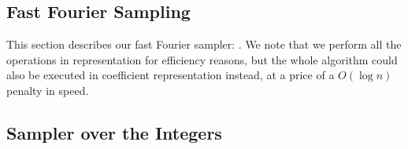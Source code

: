  
 \subsection{Fast Fourier Sampling}
 
 This section describes our fast Fourier sampler: \longffsampling. We note that we perform all the operations in \fft representation for efficiency reasons, but the whole algorithm could also be executed in coefficient representation instead, at a price of a $O(\log n)$ penalty in speed.
 
 
 \begin{algorithm}[!htb]
  \caption{$\ffsampling_{\ n}(\vect, \tree)$}\label{alg:ffsampling}
 \begin{algorithmic}[1]
  \label{line:samplerz0}
  \label{line:samplerz1}
  \EndIf
  \end{algorithmic}
 \end{algorithm}

\newpage

\subsection{Sampler over the Integers}\label{sec:spec:sign:integers}

